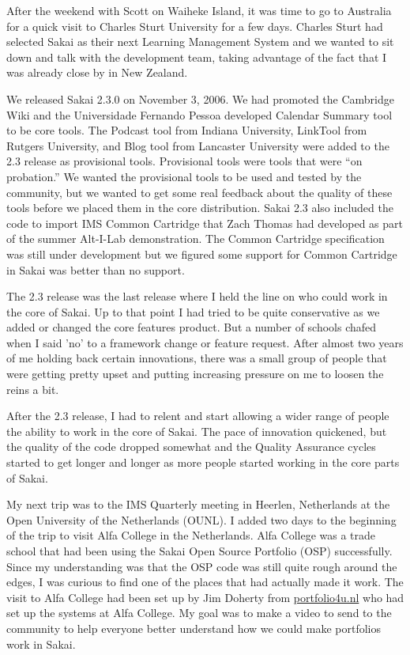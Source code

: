 \documentclass[12pt]{book}
\begin{document}

After the weekend with Scott on Waiheke Island, it was time
to go to Australia for a quick visit to Charles Sturt
University for a few days.  Charles Sturt had selected Sakai
as their next Learning Management System and we wanted to
sit down and talk with the development team, taking
advantage of the fact that I was already close by in New
Zealand.

We released Sakai 2.3.0 on November 3, 2006.   We had promoted
the Cambridge Wiki and the Universidade Fernando Pessoa developed
Calendar Summary tool to be core tools.  The Podcast tool
from Indiana University, LinkTool from Rutgers University,
and Blog tool from Lancaster University were added to the
2.3 release as provisional tools.   Provisional tools were tools
that were ``on probation.''   We wanted the provisional tools
to be used and tested by the community, but we wanted
to get some real feedback about the quality of these tools
before we placed them in the core distribution.  Sakai
2.3 also included the code to import IMS Common Cartridge
that Zach Thomas had developed as part of the summer
Alt-I-Lab demonstration.  The Common Cartridge specification
was still under development but we figured some support
for Common Cartridge in Sakai was better than no support.

The 2.3 release was the last release where I held the line
on who could work in the core of Sakai.   Up to that
point I had
tried to be quite conservative as we added or changed
the core features product.   But a number of schools
chafed when I said 'no' to a framework change or feature
request.  After almost two years of me holding back certain
innovations, there was a small group of people that were getting
pretty upset and putting increasing pressure on me to
loosen the reins a bit.

After the 2.3 release, I had to relent and start allowing
a wider range of people the ability to work in the core of Sakai.
The pace of innovation quickened, but the quality of the code
dropped somewhat and the Quality Assurance cycles started to
get longer and longer as more people started working in
the core parts of Sakai.


My next trip was to the IMS Quarterly meeting in Heerlen,
Netherlands at the Open University of the Netherlands (OUNL).
I added two days to the beginning of the trip to visit Alfa
College in the Netherlands.  Alfa College was a trade school
that had been using the Sakai Open Source Portfolio (OSP)
successfully.  Since my understanding was that the OSP code
was still quite rough around the edges, I was curious to find one of the
places that had actually made it work.  The visit to Alfa
College had been set up by Jim Doherty from \url{portfolio4u.nl}
who had set up the systems at Alfa College.  My goal
was to make a video to send to the community to help everyone
better understand how we could make portfolios work in Sakai.
\end{document}
